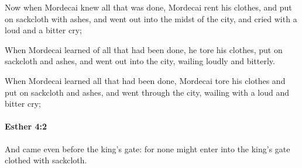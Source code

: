 			\begin{versebox}
					\item[BHS] 
					\item[LXX] 
					\item[ASV] Now when Mordecai knew all that was done, Mordecai rent his clothes, and put on sackcloth with ashes, and went out into the midst of the city, and cried with a loud and a bitter cry;
					\item[NIV] When Mordecai learned of all that had been done, he tore his clothes, put on sackcloth and ashes, and went out into the city, wailing loudly and bitterly.
					\item[NRSV] When Mordecai learned all that had been done, Mordecai tore his clothes and put on sackcloth and ashes, and went through the city, wailing with a loud and bitter cry;
			\end{versebox}

		\paragraph{Esther 4:2} %
			\label{ESTHER-4-2}

			And came even before the king’s gate: for none might enter into the king’s gate clothed with sackcloth.

